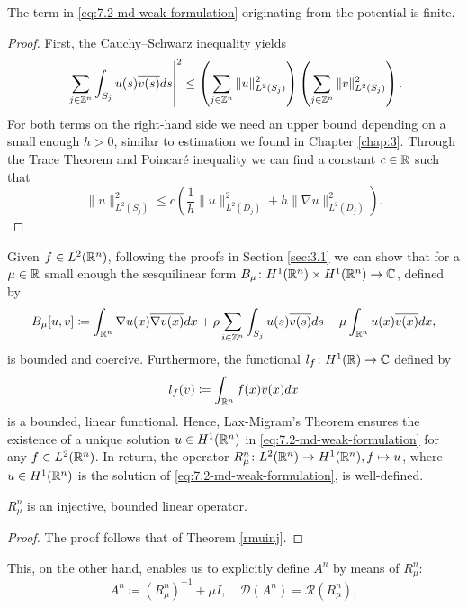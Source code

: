 \begin{remark} 
	The term in \eqref{eq:7.2-md-weak-formulation} originating from the potential is finite.
	
	\begin{proof}
	 First, the Cauchy–Schwarz inequality yields
	\[ \left| \sum_{j \in \mathbb{Z}^{n}} \int_{S_{j}} u(s) \overline{v(s)} ds \right|^{2} \leq \left( \sum_{j \in \mathbb{Z}^{n}} \| u \|_{L^{2}(S_{j})}^{2} \right) \left( \sum_{j \in \mathbb{Z}^{n}} \| v \|_{L^{2}(S_{j})}^{2} \right). \] 
	For both terms on the right-hand side we need an upper bound depending on a small enough $h > 0$, similar to estimation we found in Chapter \ref{chap:3}. Through the Trace Theorem \cite[p. 258]{evans1998partial} and Poincaré inequality we can find a constant $c \in \mathbb{R}$ such that 
	\[ \| u \|_{L^{2}(S_{j})}^{2} \leq c \left( \frac{1}{h} \|u\|_{L^{2}(D_{j})}^{2} + h \| \nabla u \|_{L^{2}(D_{j})}^{2} \right). \]	\vspace{-0.5cm}
	\end{proof}
\end{remark}

Given $f \in L^{2}(\mathbb{R}^{n})$, following the proofs in Section \ref{sec:3.1} we can show that for a $\mu \in \mathbb{R}$ small enough the sesquilinear form $B_{\mu} \colon H^{1}(\mathbb{R}^{n}) \times H^{1}(\mathbb{R}^{n}) \rightarrow \mathbb{C}$, defined by
\[ B_{\mu}[u, v] \coloneqq \int_{\mathbb{R}^{n}} \nabla u(x) \overline{\nabla v(x)} dx + \rho \sum_{i \in \mathbb{Z}^{n}} \int_{S_{j}} u(s) \overline{v(s)} ds - \mu \int_{\mathbb{R}^{n}} u(x) \overline{v(x)} dx, \]
 is  bounded and coercive. Furthermore, the functional $l_{f} \colon H^{1}(\mathbb{R}) \rightarrow \mathbb{C}$ defined by
	\[ l_{f}(v) \coloneqq \int_{\mathbb{R}^{n}} f(x) \overline{v}(x) dx \]
is a bounded, linear functional. Hence, Lax-Migram's Theorem ensures the existence of a unique solution $u \in H^{1}(\mathbb{R}^{n})$ in \eqref{eq:7.2-md-weak-formulation} for any $f \in L^{2}(\mathbb{R}^{n})$. In return, the operator $R_{\mu}^{n} \colon L^{2}(\mathbb{R}^{n}) \rightarrow H^{1}(\mathbb{R}^{n}), f \mapsto u$, where $u \in H^{1}(\mathbb{R}^{n})$ is the solution of \eqref{eq:7.2-md-weak-formulation}, is well-defined. 

\begin{theorem} 
	$R_{\mu}^{n}$ is an injective, bounded linear operator.  
	
	\begin{proof}
		The proof follows that of Theorem \ref{rmuinj}.
	\end{proof}
\end{theorem}

This, on the other hand, enables us to explicitly define $A^{n}$ by means of $R_{\mu}^{n}$:
\[ A^{n} \coloneqq \left(R_{\mu}^{n}\right)^{-1} + \mu I, \quad \mathcal{D}(A^{n}) = \mathcal{R}(R_{\mu}^{n}), \]

